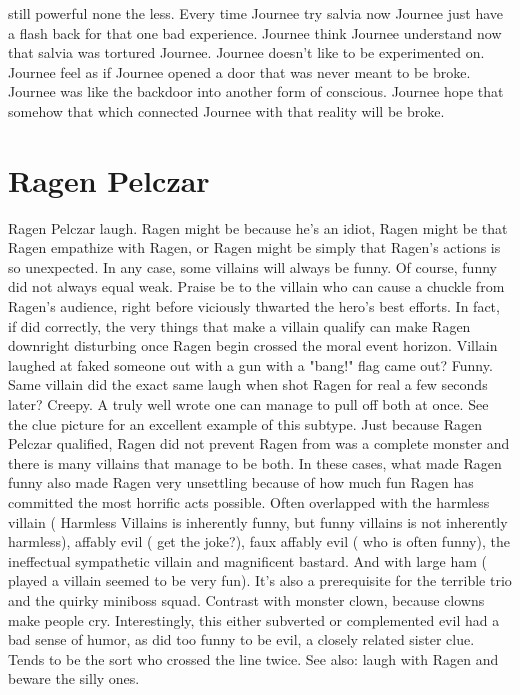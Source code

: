 \documentclass[12pt]{book}
\begin{document}
still powerful none the less. Every time Journee try salvia now Journee just have a flash back for that one bad experience. Journee think Journee understand now that salvia was tortured Journee. Journee doesn't like to be experimented on. Journee feel as if Journee opened a door that was never meant to be broke. Journee was like the backdoor into another form of conscious. Journee hope that somehow that which connected Journee with that reality will be broke.



\chapter{Ragen Pelczar}

Ragen Pelczar laugh. Ragen might be because he's an idiot, Ragen might be that Ragen empathize with Ragen, or Ragen might be simply that Ragen's actions is so unexpected. In any case, some villains will always be funny. Of course, funny did not always equal weak. Praise be to the villain who can cause a chuckle from Ragen's audience, right before viciously thwarted the hero's best efforts. In fact, if did correctly, the very things that make a villain qualify can make Ragen downright disturbing once Ragen begin crossed the moral event horizon. Villain laughed at faked someone out with a gun with a "bang!" flag came out? Funny. Same villain did the exact same laugh when shot Ragen for real a few seconds later? Creepy. A truly well wrote one can manage to pull off both at once. See the clue picture for an excellent example of this subtype. Just because Ragen Pelczar qualified, Ragen did not prevent Ragen from was a complete monster and there is many villains that manage to be both. In these cases, what made Ragen funny also made Ragen very unsettling because of how much fun Ragen has committed the most horrific acts possible. Often overlapped with the harmless villain ( Harmless Villains is inherently funny, but funny villains is not inherently harmless), affably evil ( get the joke?), faux affably evil ( who is often funny), the ineffectual sympathetic villain and magnificent bastard. And with large ham ( played a villain seemed to be very fun). It's also a prerequisite for the terrible trio and the quirky miniboss squad. Contrast with monster clown, because clowns make people cry. Interestingly, this either subverted or complemented evil had a bad sense of humor, as did too funny to be evil, a closely related sister clue. Tends to be the sort who crossed the line twice. See also: laugh with Ragen and beware the silly ones.
\end{document}
